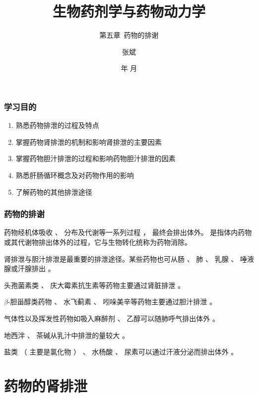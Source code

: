 \documentclass[dvipsnames, svgnames, x11names]{beamer}
\title{生物药剂学与药物动力学}
\subtitle{第五章\ 药物的排谢}
\author{张斌}
\institute[理工系]{河北农业大学 理工系}
\date{\the\year 年 \the\month 月}
\begin{document}
	
\maketitle


\begin{frame}
    \frametitle{学习目的}
    \begin{enumerate}
      \item 熟悉药物排泄的过程及特点
      \item 掌握药物肾排泄的机制和影响肾排泄的主要因素
      \item 掌握药物胆汁排泄的过程和影响药物胆汁排泄的因素
      \item 熟悉肝肠循环概念及对药物作用的影响
      \item 了解药物的其他排泄途径
    \end{enumerate}
\end{frame}

\begin{frame}
    \frametitle{药物的排谢}
    药物经机体吸收 、 分布及代谢等一系列过程 ， 最终会排出体外。 是指体内药物或其代谢物排出体外的过程，它与生物转化统称为药物消除。
    
    肾排泄与胆汁排泄是最重要的排泄途径。某些药物也可从肠 、 肺 、 乳腺 、 唾液腺或汗腺排出 。
    \begin{blankblock}{}
        头孢菌素类 、 庆大霉素抗生素等药物主要通过肾脏排泄 。
        
        $\beta$-胆甾醇类药物 、 水飞蓟素 、 吲哚美辛等药物主要通过胆汁排泄 。
        
        气体性以及挥发性药物如吸入麻醉剂 、 乙醇可以随肺呼气排出体外 。
        
        地西泮 、 茶碱从乳汁中排泄的量较大 。
        
        盐类 （ 主要是氯化物 ） 、 水杨酸 、 尿素可以通过汗液分泌而排出体外 。
    \end{blankblock}
    
\end{frame}


\begin{frame}{}
	\begin{center}
		{\Huge {}}
	\end{center}
	\tableofcontents[subsectionstyle=hide/hide/show]
	\thispagestyle{empty}
	\addtocounter{framenumber}{-1}
\end{frame}


\section{药物的肾排泄}
\end{document}
